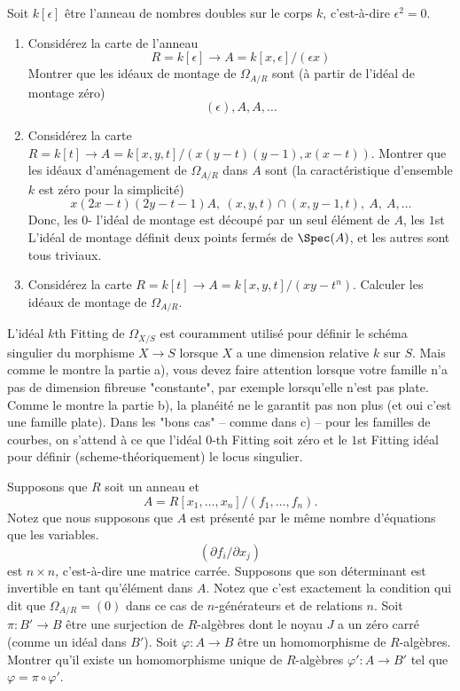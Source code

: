 \begin{exercise}
\label{exercise-dual-numbers}
Soit $k[\epsilon]$ être l'anneau de nombres doubles sur
le corps $k$, c'est-à-dire $\epsilon^2 = 0$.
\begin{enumerate}
\item Considérez la carte de l'anneau
$$
R = k[\epsilon] \to A = k[x, \epsilon]/(\epsilon x)
$$
Montrer que les idéaux de montage de $\Omega_{A/R}$ sont (à partir de
l'idéal de montage zéro)
$$
(\epsilon), A, A, \ldots
$$
\item Considérez la carte $R = k[t]
\to A = k[x, y, t]/(x(y-t)(y-1), x(x-t))$. Montrer que les idéaux d'aménagement
de $\Omega_{A/R}$ dans $A$ sont (la caractéristique d'ensemble $k$ est zéro
pour la simplicité)
$$
x(2x-t)(2y-t-1)A, \ (x, y, t)\cap (x, y-1, t), \ A, \ A, \ldots
$$
Donc, les $0$- l'idéal de montage est découpé par un seul élément de
$A$, les $1$st L'idéal de montage définit deux points fermés de $\Spec(A)$, et
les autres sont tous triviaux.
\item Considérez la carte $R = k[t] \to A = k[x, y,
t]/(xy-t^n)$. Calculer les idéaux de montage de $\Omega_{A/R}$.
\end{enumerate}
\end{exercise}

\begin{remark}
\label{remark-fitting-omega-not-sings}
L'idéal $k$th Fitting de $\Omega_{X/S}$ est couramment utilisé pour définir le
schéma singulier du morphisme $X \to S$ lorsque $X$ a une dimension relative $k$
sur $S$. Mais comme le montre la partie a), vous devez faire attention lorsque
votre famille n'a pas de dimension fibreuse "constante", par exemple lorsqu'elle n'est pas plate.
Comme le montre la partie b), la planéité ne le garantit pas non plus
(et oui c'est une famille plate). Dans les "bons cas" -- comme dans c)
-- pour les familles de courbes, on s'attend à ce que l'idéal $0$-th
Fitting soit zéro et le $1$st Fitting idéal pour définir (scheme-théoriquement) le locus singulier.
\end{remark}

\begin{exercise}
\label{exercise-formally-smooth}
Supposons que $R$ soit un anneau et
$$
A = R[x_1, \ldots, x_n]/(f_1, \ldots, f_n).
$$
Notez que nous supposons que $A$ est
présenté par le même nombre d'équations que les
variables.
$$
( \partial f_i / \partial x_j )
$$
est $n \times n$, c'est-à-dire une matrice carrée. Supposons que
son déterminant est invertible en tant qu'élément dans $A$. Notez que
c'est exactement la condition qui dit que $\Omega_{A/R} = (0)$ dans ce
cas de $n$-générateurs et de relations $n$. Soit $\pi
: B' \to B$ être une surjection de $R$-algèbres dont
le noyau $J$ a un zéro carré (comme un idéal
dans $B'$). Soit $\varphi : A \to B$ être un homomorphisme
de $R$-algèbres. Montrer qu'il existe un homomorphisme unique de $R$-algèbres
$\varphi' : A \to B'$ tel que $\varphi = \pi \circ \varphi'$.
\end{exercise}

